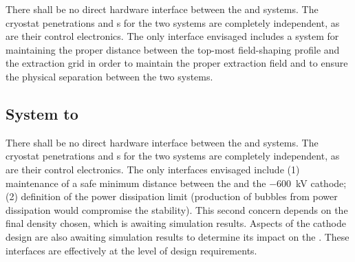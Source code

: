There shall be no direct hardware interface between the \hv and  systems. The cryostat penetrations and \fdth{}s for the two systems are completely independent, as are their control electronics. The only interface envisaged includes a system for maintaining the proper distance between the top-most field-shaping profile and the extraction grid in order to maintain the proper extraction field and to ensure the physical separation between the two systems. 

\subsection{System to }
\label{sec:fddp-hv-intfc-to-pds}


There shall be no direct hardware interface between the \hv and  systems. The cryostat penetrations and \fdth{}s for the two systems are completely independent, as are their control electronics. The only interfaces envisaged include (1) maintenance of a safe minimum distance between the  and the \SI{-600}{\kV} cathode; (2)
 definition of the  power dissipation limit (production of bubbles from power dissipation would compromise the \hv stability). This second concern depends on the final  density chosen, which is awaiting simulation results. Aspects of the cathode design are also awaiting simulation results to determine its impact on the . 
These interfaces are effectively at the level of design requirements. 
%
%
%
%
%
%
%
%
%
%
